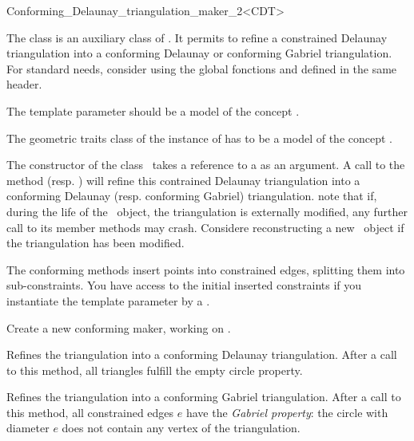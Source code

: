 \begin{ccRefClass}{Conforming_Delaunay_triangulation_maker_2<CDT>}

The class \ccRefName{} is an auxiliary class of
. It permits to refine a constrained
Delaunay triangulation into a conforming Delaunay or conforming
Gabriel triangulation. For standard needs, consider using the global
fonctions  and
 defined in the same header.

\ccParameters 

The template parameter  should be a model of the concept
.

The geometric traits class of the instance of  has to be
a model of the concept .


The constructor of the class \ccRefName\ takes a reference to a 
as an argument. A call to the method 
(resp.  ) will refine this contrained
Delaunay triangulation into a conforming Delaunay (resp. conforming
Gabriel) triangulation. note that if, during the life of the \ccRefName\ 
object, the triangulation is externally modified, any further call to its
member methods may crash. Considere reconstructing a new \ccRefName\ object
if the triangulation has been modified.

The conforming methods insert points into constrained edges, splitting
them into sub-constraints. You have access to the initial inserted
constraints if you instantiate the template parameter by a
.


\ccCreation
{}

{Create a new conforming maker, working on \ccc{t}.}

\ccOperations


{ Refines the triangulation into a conforming Delaunay triangulation.
  After a call to this method, all triangles fulfill the empty circle
  property. }

{ Refines the triangulation into a conforming Gabriel triangulation.
  After a call to this method, all constrained edges $e$ have the
  \emph{Gabriel property}: the circle with diameter $e$ 
  does not contain any vertex of the triangulation. }


\end{ccRefClass}
